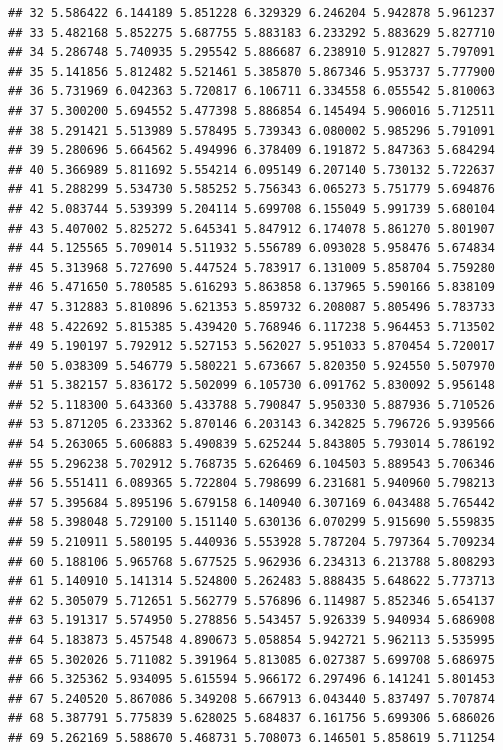 \documentclass[]{article}
\begin{document}
\begin{verbatim}
## 32 5.586422 6.144189 5.851228 6.329329 6.246204 5.942878 5.961237
## 33 5.482168 5.852275 5.687755 5.883183 6.233292 5.883629 5.827710
## 34 5.286748 5.740935 5.295542 5.886687 6.238910 5.912827 5.797091
## 35 5.141856 5.812482 5.521461 5.385870 5.867346 5.953737 5.777900
## 36 5.731969 6.042363 5.720817 6.106711 6.334558 6.055542 5.810063
## 37 5.300200 5.694552 5.477398 5.886854 6.145494 5.906016 5.712511
## 38 5.291421 5.513989 5.578495 5.739343 6.080002 5.985296 5.791091
## 39 5.280696 5.664562 5.494996 6.378409 6.191872 5.847363 5.684294
## 40 5.366989 5.811692 5.554214 6.095149 6.207140 5.730132 5.722637
## 41 5.288299 5.534730 5.585252 5.756343 6.065273 5.751779 5.694876
## 42 5.083744 5.539399 5.204114 5.699708 6.155049 5.991739 5.680104
## 43 5.407002 5.825272 5.645341 5.847912 6.174078 5.861270 5.801907
## 44 5.125565 5.709014 5.511932 5.556789 6.093028 5.958476 5.674834
## 45 5.313968 5.727690 5.447524 5.783917 6.131009 5.858704 5.759280
## 46 5.471650 5.780585 5.616293 5.863858 6.137965 5.590166 5.838109
## 47 5.312883 5.810896 5.621353 5.859732 6.208087 5.805496 5.783733
## 48 5.422692 5.815385 5.439420 5.768946 6.117238 5.964453 5.713502
## 49 5.190197 5.792912 5.527153 5.562027 5.951033 5.870454 5.720017
## 50 5.038309 5.546779 5.580221 5.673667 5.820350 5.924550 5.507970
## 51 5.382157 5.836172 5.502099 6.105730 6.091762 5.830092 5.956148
## 52 5.118300 5.643360 5.433788 5.790847 5.950330 5.887936 5.710526
## 53 5.871205 6.233362 5.870146 6.203143 6.342825 5.796726 5.939566
## 54 5.263065 5.606883 5.490839 5.625244 5.843805 5.793014 5.786192
## 55 5.296238 5.702912 5.768735 5.626469 6.104503 5.889543 5.706346
## 56 5.551411 6.089365 5.722804 5.798699 6.231681 5.940960 5.798213
## 57 5.395684 5.895196 5.679158 6.140940 6.307169 6.043488 5.765442
## 58 5.398048 5.729100 5.151140 5.630136 6.070299 5.915690 5.559835
## 59 5.210911 5.580195 5.440936 5.553928 5.787204 5.797364 5.709234
## 60 5.188106 5.965768 5.677525 5.962936 6.234313 6.213788 5.808293
## 61 5.140910 5.141314 5.524800 5.262483 5.888435 5.648622 5.773713
## 62 5.305079 5.712651 5.562779 5.576896 6.114987 5.852346 5.654137
## 63 5.191317 5.574950 5.278856 5.543457 5.926339 5.940934 5.686908
## 64 5.183873 5.457548 4.890673 5.058854 5.942721 5.962113 5.535995
## 65 5.302026 5.711082 5.391964 5.813085 6.027387 5.699708 5.686975
## 66 5.325362 5.934095 5.615594 5.966172 6.297496 6.141241 5.801453
## 67 5.240520 5.867086 5.349208 5.667913 6.043440 5.837497 5.707874
## 68 5.387791 5.775839 5.628025 5.684837 6.161756 5.699306 5.686026
## 69 5.262169 5.588670 5.468731 5.708073 6.146501 5.858619 5.711254

\end{verbatim}
\end{document}
